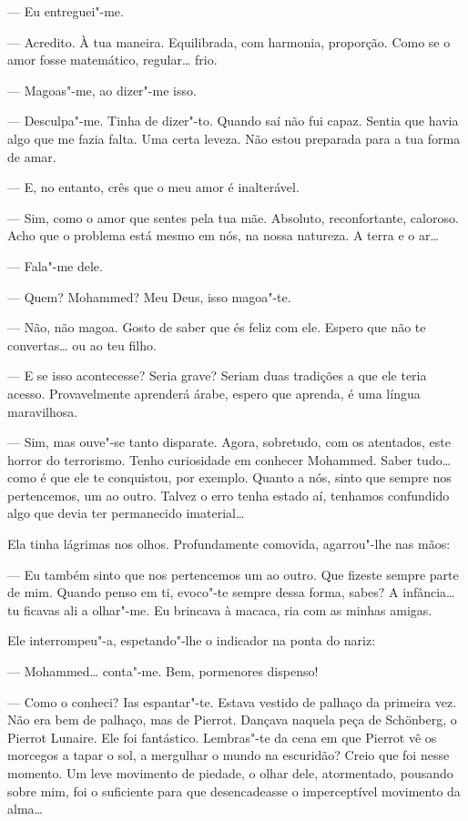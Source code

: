 --- Eu entreguei"-me.

--- Acredito. À tua maneira. Equilibrada, com harmonia, proporção. Como se
o amor fosse matemático, regular\ldots{} frio.

--- Magoas"-me, ao dizer"-me isso.

--- Desculpa"-me. Tinha de dizer"-to. Quando saí não fui capaz. Sentia que
havia algo que me fazia falta. Uma certa leveza. Não estou preparada
para a tua forma de amar.

--- E, no entanto, crês que o meu amor é inalterável.

--- Sim, como o amor que sentes pela tua mãe. Absoluto, reconfortante,
caloroso. Acho que o problema está mesmo em nós, na nossa natureza. A
terra e o ar\ldots{}

--- Fala"-me dele.

--- Quem? Mohammed? Meu Deus, isso magoa"-te.

--- Não, não magoa. Gosto de saber que és feliz com ele. Espero que não te
convertas\ldots{} ou ao teu filho.

--- E se isso acontecesse? Seria grave? Seriam duas tradições a que ele
teria acesso. Provavelmente aprenderá árabe, espero que aprenda, é uma
língua maravilhosa.

--- Sim, mas ouve"-se tanto disparate. Agora, sobretudo, com os atentados,
este horror do terrorismo. Tenho curiosidade em conhecer Mohammed. Saber
tudo\ldots{} como é que ele te conquistou, por exemplo. Quanto a nós, sinto
que sempre nos pertencemos, um ao outro. Talvez o erro tenha estado aí,
tenhamos confundido algo que devia ter permanecido imaterial\ldots{}

Ela tinha lágrimas nos olhos. Profundamente comovida, agarrou"-lhe nas
mãos:

--- Eu também sinto que nos pertencemos um ao outro. Que fizeste sempre
parte de mim. Quando penso em ti, evoco"-te sempre dessa forma, sabes? A
infância\ldots{} tu ficavas ali a olhar"-me. Eu brincava à macaca, ria com as
minhas amigas.

Ele interrompeu"-a, espetando"-lhe o indicador na ponta do nariz:

--- Mohammed\ldots{} conta"-me. Bem, pormenores dispenso!

--- Como o conheci? Ias espantar"-te. Estava vestido de palhaço da primeira
vez. Não era bem de palhaço, mas de Pierrot. Dançava naquela peça de
Schönberg, o Pierrot Lunaire. Ele foi fantástico. Lembras"-te da cena em
que Pierrot vê os morcegos a tapar o sol, a mergulhar o mundo na
escuridão? Creio que foi nesse momento. Um leve movimento de piedade, o
olhar dele, atormentado, pousando sobre mim, foi o suficiente para que
desencadeasse o imperceptível movimento da alma\ldots{}


